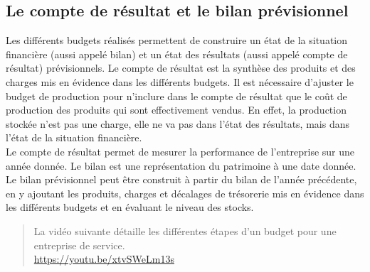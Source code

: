 \documentclass{kaobook}
\begin{document}
\subsection{Le compte de résultat et le bilan prévisionnel}
\label{sec:orgb9b440f}
Les différents budgets réalisés permettent de construire un état de la situation financière (aussi appelé bilan) et un état des résultats (aussi appelé compte de résultat) prévisionnels. Le compte de résultat est la synthèse des produits et des charges mis en évidence dans les différents budgets. Il est nécessaire d'ajuster le budget de production pour n'inclure dans le compte de résultat que le coût de production des produits qui sont effectivement vendus. En effet, la production stockée n'est pas une charge, elle ne va pas dans l'état des résultats, mais dans l'état de la situation financière.\\
Le compte de résultat permet de mesurer la performance de l'entreprise sur une année donnée. Le bilan est une représentation du patrimoine à une date donnée. Le bilan prévisionnel peut être construit à partir du bilan de l'année précédente, en y ajoutant les produits, charges et décalages de trésorerie mis en évidence dans les différents budgets et en évaluant le niveau des stocks.\\
\begin{quote}
La vidéo suivante détaille les différentes étapes d'un budget pour une entreprise de service.\\
\url{https://youtu.be/xtvSWeLm13s}\\
\end{quote}
\end{document}

